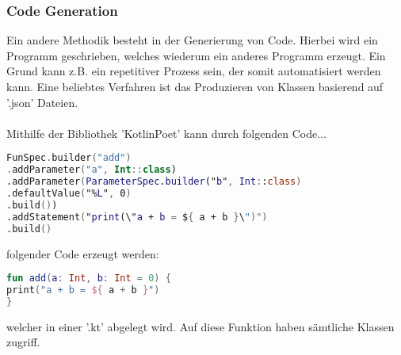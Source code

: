 \subsubsection{Code Generation}
Ein andere Methodik besteht in der Generierung von Code. Hierbei wird ein Programm geschrieben, welches wiederum ein anderes Programm erzeugt. Ein Grund kann z.B. ein repetitiver Prozess sein, der somit automatisiert werden kann. Eine beliebtes Verfahren ist das Produzieren von Klassen basierend auf '.json' Dateien.
\\
\\
Mithilfe der Bibliothek 'KotlinPoet' kann durch folgenden Code...
\begin{lstlisting}[caption={Code zum erezugen einer Funktion}, label={lst:data-class}, language=Kotlin]
FunSpec.builder("add")
.addParameter("a", Int::class)
.addParameter(ParameterSpec.builder("b", Int::class)
.defaultValue("%L", 0)
.build())
.addStatement("print(\"a + b = ${ a + b }\")")
.build()
\end{lstlisting}
\bigskip
folgender Code erzeugt werden:
\begin{lstlisting}[caption={Erzeugte Funktionen}, label={lst:data-class}, language=Kotlin]
fun add(a: Int, b: Int = 0) {
print("a + b = ${ a + b }")
}
\end{lstlisting}
welcher in einer '.kt' abgelegt wird. Auf diese Funktion haben sämtliche Klassen zugriff.
